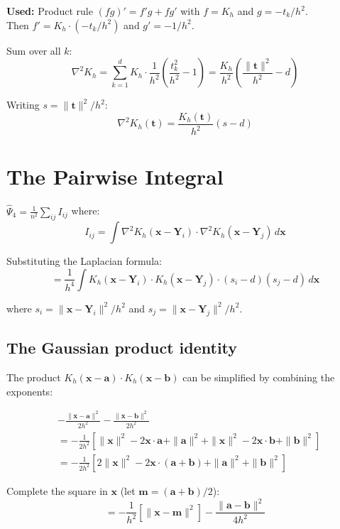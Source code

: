 \documentclass[12pt]{article}
\newcommand{\mathnote}[1]{\begin{tcolorbox}[colback=yellow!5,colframe=yellow!60!black,breakable]#1\end{tcolorbox}}
\begin{document}
\mathnote{
\textbf{Used:} Product rule $(fg)' = f'g + fg'$ with $f = K_h$ and $g = -t_k/h^2$.\\
Then $f' = K_h\cdot(-t_k/h^2)$ and $g' = -1/h^2$.
}

Sum over all $k$:
$$\nabla^2 K_h = \sum_{k=1}^d K_h\cdot\frac{1}{h^2}\left(\frac{t_k^2}{h^2}-1\right) = \frac{K_h}{h^2}\left(\frac{\|\mathbf{t}\|^2}{h^2} - d\right)$$

Writing $s = \|\mathbf{t}\|^2/h^2$:
$$\boxed{\nabla^2 K_h(\mathbf{t}) = \frac{K_h(\mathbf{t})}{h^2}(s - d)}$$

\section{The Pairwise Integral}

$\hat\Psi_4 = \frac{1}{n^2}\sum_{ij} I_{ij}$ where:
$$I_{ij} = \int \nabla^2 K_h(\mathbf{x}-\mathbf{Y}_i)\cdot\nabla^2 K_h(\mathbf{x}-\mathbf{Y}_j)\,d\mathbf{x}$$

Substituting the Laplacian formula:
$$= \frac{1}{h^4}\int K_h(\mathbf{x}-\mathbf{Y}_i)\cdot K_h(\mathbf{x}-\mathbf{Y}_j)\cdot(s_i - d)(s_j - d)\,d\mathbf{x}$$

where $s_i = \|\mathbf{x}-\mathbf{Y}_i\|^2/h^2$ and $s_j = \|\mathbf{x}-\mathbf{Y}_j\|^2/h^2$.

\subsection{The Gaussian product identity}

The product $K_h(\mathbf{x}-\mathbf{a})\cdot K_h(\mathbf{x}-\mathbf{b})$ can be simplified by combining the exponents:

\begin{align*}
&-\frac{\|\mathbf{x}-\mathbf{a}\|^2}{2h^2} - \frac{\|\mathbf{x}-\mathbf{b}\|^2}{2h^2}\\
&= -\frac{1}{2h^2}\left[\|\mathbf{x}\|^2 - 2\mathbf{x}\cdot\mathbf{a} + \|\mathbf{a}\|^2 + \|\mathbf{x}\|^2 - 2\mathbf{x}\cdot\mathbf{b} + \|\mathbf{b}\|^2\right]\\
&= -\frac{1}{2h^2}\left[2\|\mathbf{x}\|^2 - 2\mathbf{x}\cdot(\mathbf{a}+\mathbf{b}) + \|\mathbf{a}\|^2 + \|\mathbf{b}\|^2\right]
\end{align*}

Complete the square in $\mathbf{x}$ (let $\mathbf{m} = (\mathbf{a}+\mathbf{b})/2$):
$$= -\frac{1}{h^2}\left[\|\mathbf{x}-\mathbf{m}\|^2\right] - \frac{\|\mathbf{a}-\mathbf{b}\|^2}{4h^2}$$
\end{document}
